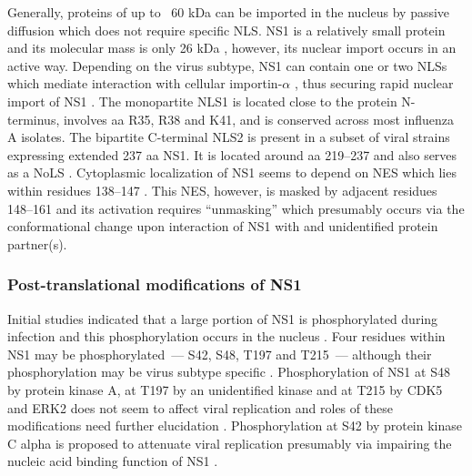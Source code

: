 		Generally, proteins of up to ~60 kDa can be imported in the nucleus by passive diffusion \parencite{Macara2001, Wang2007} which does not require specific \gls{NLS}. \gls{NS1} is a relatively small protein and its molecular mass is only 26 kDa \parencite{Ward1994}, however, its nuclear import occurs in an active way. Depending on the virus subtype, \gls{NS1} can contain one or two \glspl{NLS} which mediate interaction with cellular importin-$\alpha$ \parencite{Melen2007}, thus securing rapid nuclear import of \gls{NS1} \parencite{Privalsky1981}. The monopartite \gls{NLS}1 is located close to the protein N-terminus, involves aa R35, R38 and K41, and is conserved across most influenza A isolates. The bipartite C-terminal NLS2 is present in a subset of viral strains expressing extended 237 \gls{aa} \gls{NS1}. It is located around \gls{aa} 219--237 and also serves as a \gls{NoLS} \parencite{Melen2007, Melen2012}. Cytoplasmic localization of \gls{NS1} seems to depend on \gls{NES} which lies within residues 138--147 \parencite{Li1998}. This \gls{NES}, however, is masked by adjacent residues 148--161 and its activation requires ``unmasking'' which presumably occurs via the conformational change upon interaction of \gls{NS1} with and unidentified protein partner(s). 
		
		\subsubsection{Post-translational modifications of NS1}
		
		
		Initial studies indicated that a large portion of \gls{NS1} is phosphorylated during infection and this phosphorylation occurs in the nucleus \parencite{Privalsky1981}. Four residues within \gls{NS1} may be phosphorylated~--- S42, S48, T197 and T215~--- although their phosphorylation may be virus subtype specific \parencite{Petri1982}. Phosphorylation of \gls{NS1} at S48 by protein kinase A, at T197 by an unidentified kinase and at T215 by \gls{CDK5} and \gls{ERK2} does not seem to affect viral replication and roles of these modifications need further elucidation \parencite{Hale2009, Hutchinson2012, Hsiang2012}. Phosphorylation at S42 by protein kinase C alpha is proposed to attenuate viral replication presumably via impairing the nucleic acid binding function of \gls{NS1} \parencite{Hsiang2012}.
		
